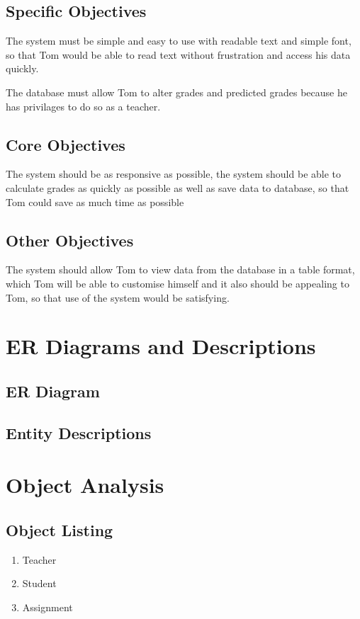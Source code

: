 \subsection{Specific Objectives}
The system must be simple and easy to use with readable text and simple font, so that Tom would be able to read text without frustration and access his data quickly. 

The database must allow Tom to alter grades and predicted grades because he has privilages to do so as a teacher.

\subsection{Core Objectives}
The system should be as responsive as possible, the system should be able to calculate grades as quickly as possible as well as save data to database, so that Tom could save as much time as possible

\subsection{Other Objectives}
The system should allow Tom to view data from the database in a table format, which Tom will be able to customise himself and it also should be appealing to Tom, so that use of the system would be satisfying.

\section{ER Diagrams and Descriptions}

\subsection{ER Diagram}

\subsection{Entity Descriptions}

\section{Object Analysis}

\subsection{Object Listing}

\begin{enumerate}
    \item Teacher
    \item Student
    \item Assignment
\end{enumerate}

